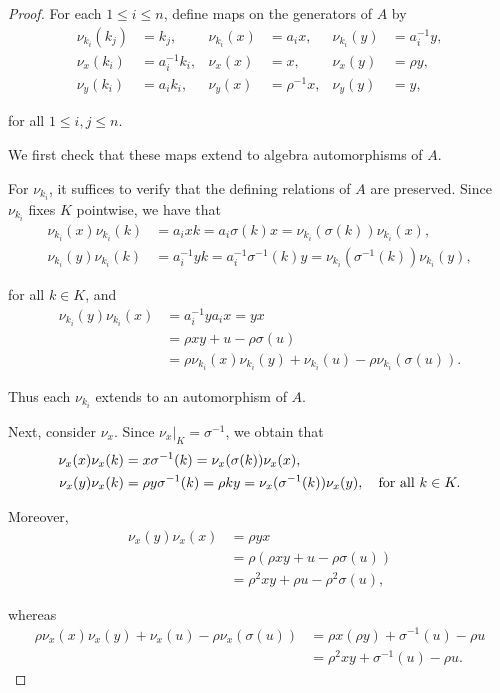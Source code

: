\documentclass{amsart}
\theoremstyle{definition}
\theoremstyle{remark}
\numberwithin{equation}{section}
\begin{document}
\begin{proof}
For each $1\leq i\leq n$, define maps on the generators of $A$ by
\begin{align*}
\nu_{k_i}(k_j) &= k_j, &
\nu_{k_i}(x) &= a_i x, &
\nu_{k_i}(y) &= a_i^{-1}y, \\
\nu_x(k_i) &= a_i^{-1}k_i, &
\nu_x(x) &= x, &
\nu_x(y) &= \rho y, \\
\nu_y(k_i) &= a_i k_i, &
\nu_y(x) &= \rho^{-1}x, &
\nu_y(y) &= y,
\end{align*}

for all $1\leq i,j\leq n$.

We first check that these maps extend to algebra automorphisms of $A$.

For $\nu_{k_i}$, it suffices to verify that the defining relations of $A$ are preserved. Since $\nu_{k_i}$ fixes $K$ pointwise, we have that 
\begin{align*}
\nu_{k_i}(x)\nu_{k_i}(k)
   &= a_i xk
    = a_i\sigma(k)x
    = \nu_{k_i}(\sigma(k))\nu_{k_i}(x), \\
\nu_{k_i}(y)\nu_{k_i}(k)
   &= a_i^{-1}yk
    = a_i^{-1}\sigma^{-1}(k)y
    = \nu_{k_i}(\sigma^{-1}(k))\nu_{k_i}(y),
\end{align*}

for all $k\in K$, and
\begin{align*}
\nu_{k_i}(y)\nu_{k_i}(x) &= a_i^{-1}ya_i x = yx \\
   &= \rho xy+u-\rho\sigma(u) \\
   &= \rho \nu_{k_i}(x)\nu_{k_i}(y)+\nu_{k_i}(u)-\rho \nu_{k_i}(\sigma(u)).
\end{align*}

Thus each $\nu_{k_i}$ extends to an automorphism of $A$.

Next, consider $\nu_x$. Since $\nu_x|_K=\sigma^{-1}$, we obtain that
\begin{align*}
\nu_x(x)\nu_x(k) &= x\sigma^{-1}(k) = \nu_x(\sigma(k))\nu_x(x), \\
\nu_x(y)\nu_x(k) &= \rho y\sigma^{-1}(k) = \rho k y = \nu_x(\sigma^{-1}(k))\nu_x(y), \quad {\rm for\ all} \ k\in K.
\end{align*}

Moreover,
\begin{align*}
\nu_x(y)\nu_x(x) &= \rho yx \\
   &= \rho(\rho xy+u-\rho\sigma(u)) \\
   &= \rho^2xy+\rho u-\rho^2\sigma(u),
\end{align*}

whereas
\begin{align*}
\rho\nu_x(x)\nu_x(y)+\nu_x(u)-\rho\nu_x(\sigma(u)) &= \rho x(\rho y)+\sigma^{-1}(u)-\rho u \\
   &= \rho^2xy+\sigma^{-1}(u)-\rho u.
\end{align*}


\end{proof}
\end{document}

